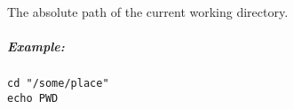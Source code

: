 \label{par:variable_pwd}

The absolute path of the current working directory.

\subparagraph{Example:}

\begin{lstlisting}[style=Groovybash, label={lst:example_variable_pwd}]
cd "/some/place"
echo PWD
\end{lstlisting}

